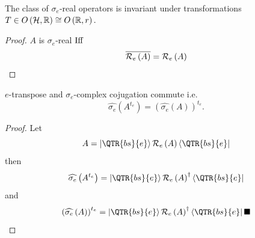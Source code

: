 \begin{lemma}
The class of $\sigma _{e}$-real operators is invariant under transformations 
$T\in O\left( {\cal H},{\Bbb R}\right) \cong O\left( {\Bbb R},r\right) .$
\end{lemma}

\begin{theorem}
\begin{proof}
$A$ is $\sigma _{e}$-real $%
\mathop{\rm Iff}%
$ 
\begin{equation}
\overline{{\cal R}_{e}\left( A\right) }={\cal R}_{e}\left( A\right) 
\end{equation}
\end{proof}
\end{theorem}

\begin{lemma}
$e$-transpose and $\sigma _{e}$-complex cojugation commute i.e. 
\begin{equation}
\widehat{\sigma _{e}}\left( A^{t_{e}}\right) =\left( \widehat{\sigma _{e}}%
\left( A\right) \right) ^{t_{e}}.
\end{equation}
\end{lemma}

\begin{theorem}
\begin{proof}
Let 
\begin{equation}
A=\left\vert \QTR{bs}{e}\right\rangle {\cal R}_{e}\left( A\right)
\left\langle \QTR{bs}{e}\right\vert 
\end{equation}%
then 
\begin{equation}
\widehat{\sigma _{e}}\left( A^{t_{e}}\right) =\left\vert \QTR{bs}{e}%
\right\rangle {\cal R}_{e}\left( A\right) ^{\dagger }\left\langle \QTR{bs}{e}%
\right\vert 
\end{equation}%
and 
\begin{equation}
\left( \widehat{\sigma _{e}}\left( A\right) \right) ^{t_{e}}=\left\vert 
\QTR{bs}{e}\right\rangle {\cal R}_{e}\left( A\right) ^{\dagger }\left\langle 
\QTR{bs}{e}\right\vert \blacksquare 
\end{equation}
\end{proof}
\end{theorem}

